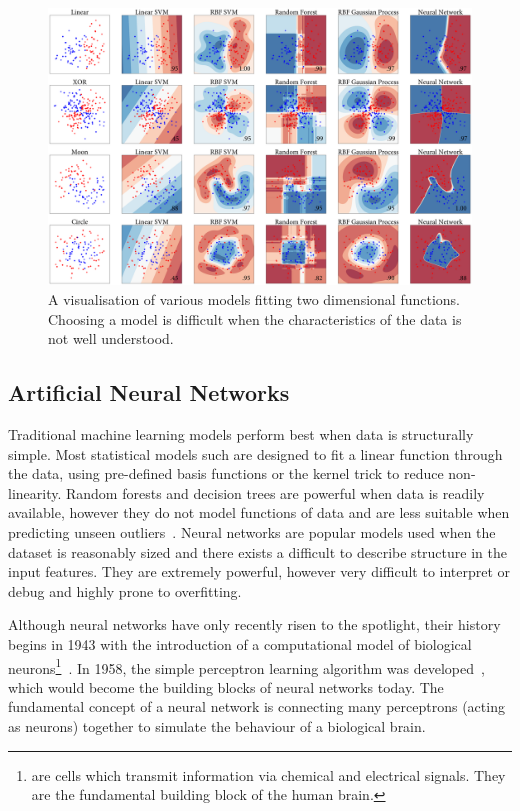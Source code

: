 \documentclass[12pt, twoside]{book}
\renewcommand\emph[1]{\textit{\color{USred}{#1}}}
\begin{document}
\begin{figure}[h]
	\label{cnnvis}
	\centerline{\centering\includegraphics[width=1.2\linewidth]{model_vis.png}}
	\caption{A visualisation of various models fitting two dimensional functions. Choosing a model is difficult when the characteristics of the data is not well understood.}
\end{figure}

\subsection{Artificial Neural Networks}

 
Traditional machine learning models perform best when data is structurally simple. Most statistical models such are designed to fit a linear function through the data, using pre-defined basis functions or the kernel trick to reduce non-linearity. Random forests and decision trees are powerful when data is readily available, however they do not model functions of data and are less suitable when predicting unseen outliers~\cite{kramer2001propositionalization}. Neural networks are popular models used when the dataset is reasonably sized and there exists a difficult to describe structure in the input features. They are extremely powerful, however very difficult to interpret or debug and highly prone to overfitting.
 
\label{neuralnetworkintro}Although neural networks have only recently risen to the spotlight, their history begins in 1943 with the introduction of a computational model of biological neurons\footnote{\emph{Neurons} are cells which transmit information via chemical and electrical signals. They are the fundamental building block of the human brain.}~\cite{nn1943}.
In 1958, the simple perceptron learning algorithm was developed~\cite{rosenblatt1958perceptron}, which would become the building blocks of neural networks today. The fundamental concept of a neural network is connecting many perceptrons (acting as neurons) together to simulate the behaviour of a biological brain. 
\end{document}
